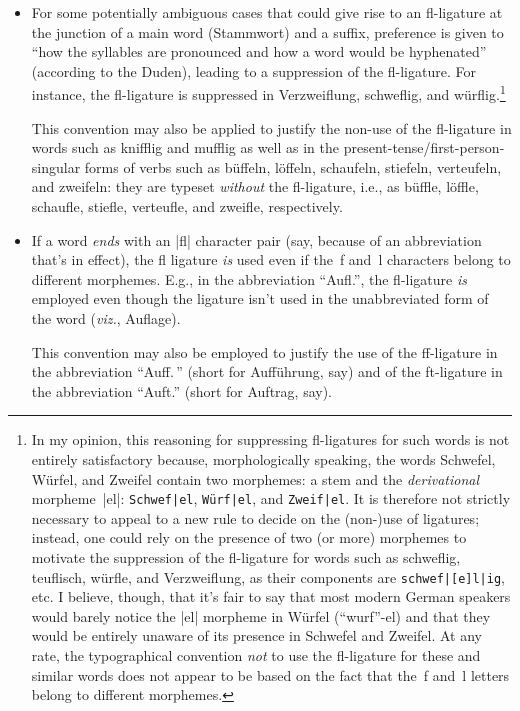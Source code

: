 \documentclass[11pt]{article}
\begin{document}
\begin{itemize}
\item For some potentially ambiguous cases that could give rise to an fl-ligature at the junction of a main word (Stammwort) and a suffix, preference is given to \enquote{how the syllables are pronounced and how a word would be hyphenated} (according to the Duden), leading to a suppression of the fl-ligature. For instance, the fl-ligature is suppressed in Verzweif\-lung, schweflig, and würflig.\footnote{%
In my opinion, this reasoning for suppressing fl-ligatures for such words is not entirely satisfactory because, morphologically speaking, the words Schwefel, Würfel, and Zweifel contain two morphemes: a stem and the \emph{derivational} morpheme~|el|: \Verb+Schwef|el+, \Verb+Würf|el+, and \Verb+Zweif|el+. It is therefore not strictly necessary to appeal to a new rule to decide on the (non-)use of ligatures; instead, one could rely on the presence of two (or more) morphemes to motivate the suppression of the fl-ligature for words such as schweflig, teuflisch, würfle, and Verzweiflung, as their components are \Verb+schwef|[e]l|ig+, etc. I believe, though, that it's fair to say that most modern German speakers would barely notice the |el| morpheme in Würfel (\enquote{wurf}-el) and that they would be entirely unaware of its presence in Schwefel and Zweifel. At any rate, the typographical convention \emph{not} to use the fl-ligature for these and similar words does not appear to be based on the fact that the~f and~l letters belong to different morphemes.}

This convention may also be applied to justify the non-use of the fl-ligature in words such as knifflig and mufflig as well as in the present-tense/first-person-singular forms of verbs such as büffeln, löffeln, schaufeln, stiefeln, verteufeln, and zweifeln: they are typeset \emph{without} the fl-ligature, i.e., as büffle, löffle, schaufle, stiefle, verteufle, and zweifle, respectively.

\item If a word \emph{ends} with an |fl| character pair (say, because of an abbreviation that's in effect), the fl ligature \emph{is} used even if the~f and~l characters belong to different morphemes. E.g., in the abbreviation \enquote{Aufl.}, the fl-ligature \emph{is} employed even though the ligature isn't used in the unabbreviated form of the word (\emph{viz.}, Auflage).

This convention may also be employed to justify the use of the ff-ligature in the abbreviation \enquote{Auff.\,} (short for Aufführung, say) and of the ft-ligature in the abbreviation \enquote{Auft.} (short for Auftrag, say).


\end{itemize}
\end{document}
